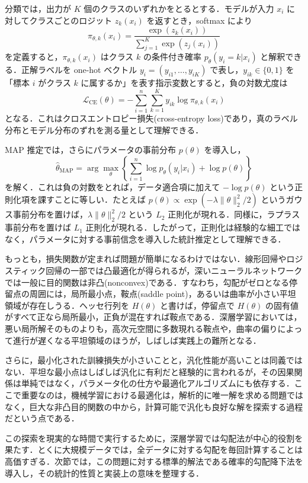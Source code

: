 分類では，出力が $K$ 個のクラスのいずれかをとるとする．モデルが入力 $x_i$ に対してクラスごとのロジット $z_k(x_i)$ を返すとき，softmax により
\[
\pi_{\theta,k}(x_i)
= \frac{\exp(z_k(x_i))}{\sum_{j=1}^K \exp(z_j(x_i))}
\]
を定義すると，$\pi_{\theta,k}(x_i)$ はクラス $k$ の条件付き確率 $p_\theta(y_i=k|x_i)$ と解釈できる．正解ラベルを one-hot ベクトル $y_i=(y_{i1},\dots,y_{iK})$ で表し，$y_{ik}\in\{0,1\}$ を「標本 $i$ がクラス $k$ に属するか」を表す指示変数とすると，負の対数尤度は
\[
\mathcal L_{\mathrm{CE}}(\theta)
= -\sum_{i=1}^n \sum_{k=1}^K y_{ik}\log \pi_{\theta,k}(x_i)
\]
となる．これはクロスエントロピー損失(cross-entropy loss)であり，真のラベル分布とモデル分布のずれを測る量として理解できる．

MAP 推定では，さらにパラメータの事前分布 $p(\theta)$ を導入し，
\[
\hat\theta_{\mathrm{MAP}}
= \arg\max_\theta
\left\{
\sum_{i=1}^n \log p_\theta(y_i|x_i)+ \log p(\theta)
\right\}
\]
を解く．これは負の対数をとれば，データ適合項に加えて $-\log p(\theta)$ という正則化項を課すことに等しい．たとえば $p(\theta)\propto \exp(-\lambda \|\theta\|_2^2/2)$ というガウス事前分布を置けば，$\lambda \|\theta\|_2^2/2$ という $L_2$ 正則化が現れる．同様に，ラプラス事前分布を置けば $L_1$ 正則化が現れる．したがって，正則化は経験的な細工ではなく，パラメータに対する事前信念を導入した統計推定として理解できる．

もっとも，損失関数が定まれば問題が簡単になるわけではない．線形回帰やロジスティック回帰の一部では凸最適化が得られるが，深いニューラルネットワークでは一般に目的関数は非凸(nonconvex)である．すなわち，勾配がゼロとなる停留点の周囲には，局所最小点，鞍点(saddle point)，あるいは曲率が小さい平坦領域が存在しうる．ヘッセ行列を $H(\theta)$ と書けば，停留点で $H(\theta)$ の固有値がすべて正なら局所最小，正負が混在すれば鞍点である．深層学習においては，悪い局所解そのものよりも，高次元空間に多数現れる鞍点や，曲率の偏りによって進行が遅くなる平坦領域のほうが，しばしば実践上の難所となる．

さらに，最小化された訓練損失が小さいことと，汎化性能が高いことは同義ではない．平坦な最小点はしばしば汎化に有利だと経験的に言われるが，その因果関係は単純ではなく，パラメータ化の仕方や最適化アルゴリズムにも依存する．ここで重要なのは，機械学習における最適化は，解析的に唯一解を求める問題ではなく，巨大な非凸目的関数の中から，計算可能で汎化も良好な解を探索する過程だという点である．

この探索を現実的な時間で実行するために，深層学習では勾配法が中心的役割を果たす．とくに大規模データでは，全データに対する勾配を毎回計算することは高価すぎる．次節では，この問題に対する標準的解法である確率的勾配降下法を導入し，その統計的性質と実装上の意味を整理する．

